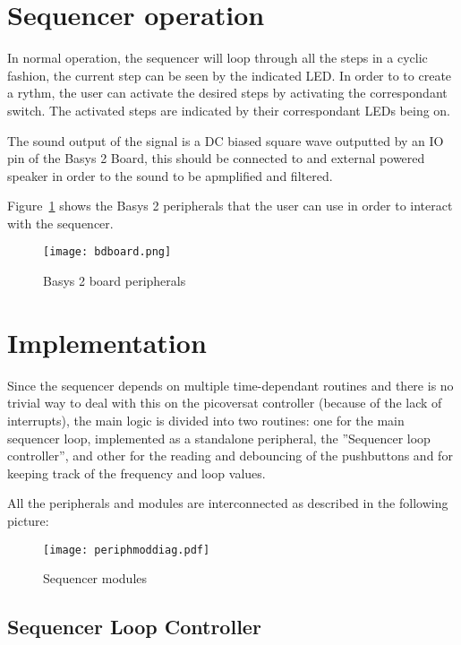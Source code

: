
\section{Sequencer operation}



In normal operation, the sequencer will loop through all the steps in a cyclic fashion, the current step can be seen by the indicated LED. In order to to create a rythm, the user can activate the desired steps by activating the correspondant switch. The activated steps are indicated by their correspondant LEDs being on.  

The sound output of the signal is a DC biased square wave outputted by an IO pin of the Basys 2 Board, this should be connected to and external powered speaker in order to the sound to be apmplified and filtered.


Figure~\ref{fig:bdbasys2} shows the Basys 2 peripherals that the user can use in order to interact with the sequencer.

\begin{figure}[!h]
  \centerline{\texttt{[image: bdboard.png]}}
  \vspace{0cm}\caption{Basys 2 board peripherals}
  \label{fig:bdbasys2}
\end{figure}

\section{Implementation}


Since the sequencer depends on multiple time-dependant routines and there is no trivial way to deal with this on the picoversat controller (because of the lack of interrupts), the main logic is divided into two routines: one for the main sequencer loop, implemented as a standalone peripheral, the ''Sequencer loop controller'', and other for the reading and debouncing of the pushbuttons and for keeping track of the frequency and loop values.


\noindent All the peripherals and modules are interconnected as described in the following picture:

\begin{figure}[!htbp]
  \centerline{\texttt{[image: periphmoddiag.pdf]}}
  \vspace{0cm}\caption{Sequencer modules}
  \label{fig:periphmoddiag}
\end{figure}


\subsection{Sequencer Loop Controller}


